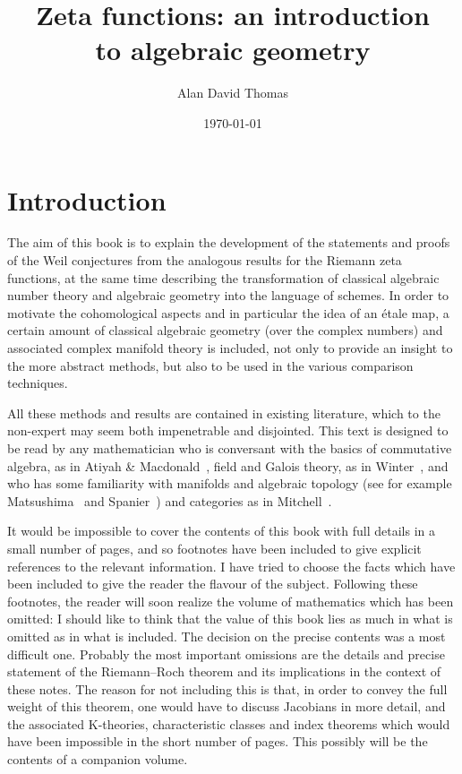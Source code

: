 \documentclass[10pt]{article}
\author{Alan David Thomas}
\date{\today}
\title{Zeta functions: an introduction\\to algebraic geometry}
\theoremstyle{definition}
\begin{document}
\maketitle


\section*{Introduction}

The aim of this book is to explain the development of the statements and proofs of the Weil conjectures from the analogous results for the Riemann zeta functions, at the same time describing the transformation of classical algebraic number theory and algebraic geometry into the language of schemes.
In order to motivate the cohomological aspects and in particular the idea of an \'etale map, a certain amount of classical algebraic geometry (over the complex numbers) and associated complex manifold theory is included, not only to provide an insight to the more abstract methods, but also to be used in the various comparison techniques.

All these methods and results are contained in existing literature, which to the non-expert may seem both impenetrable and disjointed.
This text is designed to be read by any mathematician who is conversant with the basics of commutative algebra, as in Atiyah \& Macdonald~\cite{bib:17}, field and Galois theory, as in Winter~\cite{bib:217}, and who has some familiarity with manifolds and algebraic topology (see for example Matsushima~\cite{bib:138} and Spanier~\cite{bib:183}) and categories as in Mitchell~\cite{bib:141}.

It would be impossible to cover the contents of this book with full details in a small number of pages, and so footnotes have been included to give explicit references to the relevant information.
I have tried to choose the facts which have been included to give the reader the flavour of the subject.
Following these footnotes, the reader will soon realize the volume of mathematics which has been omitted:
I should like to think that the value of this book lies as much in what is omitted as in what is included.
The decision on the precise contents was a most difficult one.
Probably the most important omissions are the details and precise statement of the Riemann--Roch theorem and its implications in the context of these notes.
The reason for not including this is that, in order to convey the full weight of this theorem, one would have to discuss Jacobians in more detail, and the associated K-theories, characteristic classes and index theorems which would have been impossible in the short number of pages.
This possibly will be the contents of a companion volume.
\end{document}
